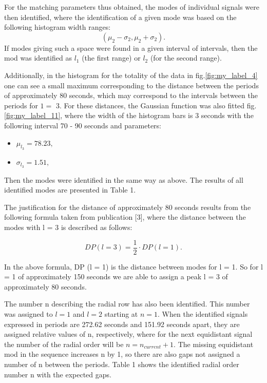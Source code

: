 \documentclass{aa}
\begin{document}
For the matching parameters thus obtained, the modes of individual signals were then identified, where the identification of a given mode was based on the following histogram width ranges:
   $$ ( \mu_2 - \sigma_2, \mu_2 + \sigma_2 ). $$ 
If modes giving such a space were found in a given interval of intervals, then the mod was identified as $ l_1 $ (the first range) or $ l_2 $ (for the second range).

Additionally, in the histogram for the totality of the data in fig.\ref{fig:my_label_4} one can see a small maximum corresponding to the distance between the periods of approximately 80 seconds, which may correspond to the intervals between the periods for $ 1 = $ 3. For these distances, the Gaussian function was also fitted fig.\ref{fig:my_label_11}, where the width of the histogram bars is 3 seconds with the following interval 70 - 90 seconds and parameters: 

\begin{itemize}
    \item $\mu_{l_3} = 78.23,$
    \item $\sigma_{l_3} = 1.51,$
\end{itemize}

Then the modes were identified in the same way as above. The results of all identified modes are presented in Table 1.

The justification for the distance of approximately 80 seconds results from the following formula taken from publication [3], where the distance between the modes with l = 3 is described as follows:

\begin{equation}
    DP(l=3) = \frac{1}{2} \cdot DP(l=1).
\end{equation}

In the above formula, DP (l = 1) is the distance between modes for l = 1. So for l = 1 of approximately 150 seconds we are able to assign a peak l = 3 of approximately 80 seconds.

The number n describing the radial row has also been identified. This number was assigned to $ l = 1$  and $ l = 2$  starting at $ n = 1$. When the identified signals expressed in periods are 272.62 seconds and 151.92 seconds apart, they are assigned relative values of n, respectively, where for the next equidistant signal the number of the radial order will be $ n = n_{current} + 1$. The missing equidistant mod in the sequence increases n by 1, so there are also gaps not assigned a number of n between the periods. Table 1 shows the identified radial order number n with the expected gaps.
\end{document}

